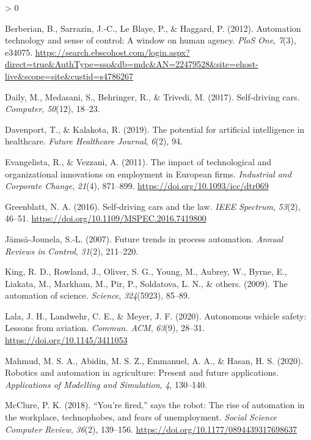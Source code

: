 \documentclass[
  english,
  man]{apa7}
\newlength{\cslhangindent}
\newenvironment{CSLReferences}[2] %
 {%
  \setlength{\parindent}{0pt}
  \ifodd #1 \everypar{\setlength{\hangindent}{\cslhangindent}}\ignorespaces\fi
  \ifnum #2 > 0
  \setlength{\parskip}{#2\baselineskip}
  \fi
 }%
 {}
\begin{document}
\begin{CSLReferences}{1}{0}
\leavevmode\hypertarget{ref-2247952820120101}{}%
Berberian, B., Sarrazin, J.-C., Le Blaye, P., \& Haggard, P. (2012). Automation technology and sense of control: A window on human agency. \emph{PloS One}, \emph{7}(3), e34075. \url{https://search.ebscohost.com/login.aspx?direct=true\&AuthType=sso\&db=mdc\&AN=22479528\&site=ehost-live\&scope=site\&custid=s4786267}

\leavevmode\hypertarget{ref-daily2017self}{}%
Daily, M., Medasani, S., Behringer, R., \& Trivedi, M. (2017). Self-driving cars. \emph{Computer}, \emph{50}(12), 18--23.

\leavevmode\hypertarget{ref-davenport2019potential}{}%
Davenport, T., \& Kalakota, R. (2019). The potential for artificial intelligence in healthcare. \emph{Future Healthcare Journal}, \emph{6}(2), 94.

\leavevmode\hypertarget{ref-10.1093ux2ficcux2fdtr069}{}%
Evangelista, R., \& Vezzani, A. (2011). {The impact of technological and organizational innovations on employment in European firms}. \emph{Industrial and Corporate Change}, \emph{21}(4), 871--899. \url{https://doi.org/10.1093/icc/dtr069}

\leavevmode\hypertarget{ref-7419800}{}%
Greenblatt, N. A. (2016). Self-driving cars and the law. \emph{IEEE Spectrum}, \emph{53}(2), 46--51. \url{https://doi.org/10.1109/MSPEC.2016.7419800}

\leavevmode\hypertarget{ref-jamsa2007future}{}%
Jämsä-Jounela, S.-L. (2007). Future trends in process automation. \emph{Annual Reviews in Control}, \emph{31}(2), 211--220.

\leavevmode\hypertarget{ref-king2009automation}{}%
King, R. D., Rowland, J., Oliver, S. G., Young, M., Aubrey, W., Byrne, E., Liakata, M., Markham, M., Pir, P., Soldatova, L. N., \& others. (2009). The automation of science. \emph{Science}, \emph{324}(5923), 85--89.

\leavevmode\hypertarget{ref-10.1145ux2f3411053}{}%
Lala, J. H., Landwehr, C. E., \& Meyer, J. F. (2020). Autonomous vehicle safety: Lessons from aviation. \emph{Commun. ACM}, \emph{63}(9), 28--31. \url{https://doi.org/10.1145/3411053}

\leavevmode\hypertarget{ref-mahmud2020robotics}{}%
Mahmud, M. S. A., Abidin, M. S. Z., Emmanuel, A. A., \& Hasan, H. S. (2020). Robotics and automation in agriculture: Present and future applications. \emph{Applications of Modelling and Simulation}, \emph{4}, 130--140.

\leavevmode\hypertarget{ref-PaulKMcclure2018}{}%
McClure, P. K. (2018). {``You're fired,''} says the robot: The rise of automation in the workplace, technophobes, and fears of unemployment. \emph{Social Science Computer Review}, \emph{36}(2), 139--156. \url{https://doi.org/10.1177/0894439317698637}


\end{CSLReferences}
\end{document}

